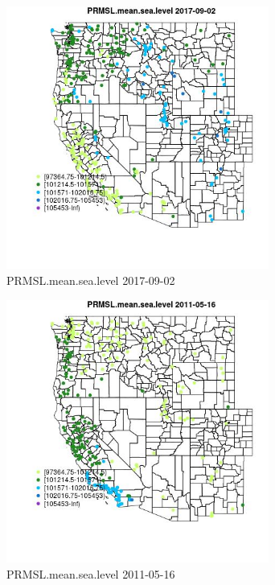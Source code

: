 \begin{figure} 
\centering  
\includegraphics[width=0.77\textwidth]{Code_Outputs/Report_ML_input_PM25_Step4_part_e_de_duplicated_aves_compiled_2019-05-20wNAs_MapObsPRMSLmeansealevel2017-09-02.jpg} 
\caption{\label{fig:Report_ML_input_PM25_Step4_part_e_de_duplicated_aves_compiled_2019-05-20wNAsMapObsPRMSLmeansealevel2017-09-02}PRMSL.mean.sea.level 2017-09-02} 
\end{figure} 
 

\begin{figure} 
\centering  
\includegraphics[width=0.77\textwidth]{Code_Outputs/Report_ML_input_PM25_Step4_part_e_de_duplicated_aves_compiled_2019-05-20wNAs_MapObsPRMSLmeansealevel2011-05-16.jpg} 
\caption{\label{fig:Report_ML_input_PM25_Step4_part_e_de_duplicated_aves_compiled_2019-05-20wNAsMapObsPRMSLmeansealevel2011-05-16}PRMSL.mean.sea.level 2011-05-16} 
\end{figure} 
 


